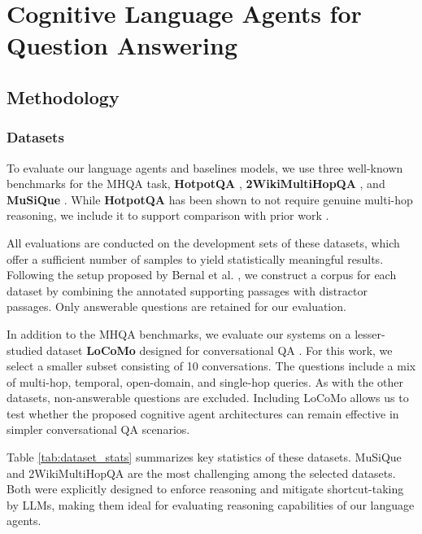 \cleardoublepage
\chapter{Cognitive Language Agents for Question Answering}
\label{ch:development}
\label{ch:chapter3}

\section{Methodology}
\subsection{Datasets}

To evaluate our language agents and baselines models, we use three  well-known benchmarks for the MHQA task, \textbf{HotpotQA} \cite{yang2018hotpotqa}, \textbf{2WikiMultiHopQA} \cite{ho-etal-2020-constructing}, and \textbf{MuSiQue} \cite{trivedi2021musique}. While \textbf{HotpotQA} has been shown to not require genuine multi-hop reasoning, we include it to support comparison with prior work \cite{trivedi2021musique}.

\noindent All evaluations are conducted on the development sets of these datasets, which offer a sufficient number of samples to yield statistically meaningful results. Following the setup proposed by Bernal et al. \cite{NEURIPS2024_6ddc001d}, we construct a corpus for each dataset by combining the annotated supporting passages with distractor passages. Only answerable questions are retained for our evaluation.

\noindent In addition to the MHQA benchmarks, we evaluate our systems on a lesser-studied dataset \textbf{LoCoMo} designed for conversational QA \cite{maharana-etal-2024-evaluating}. For this work, we select a smaller subset consisting of 10 conversations. The questions include a mix of multi-hop, temporal, open-domain, and single-hop queries. As with the other datasets, non-answerable questions are excluded. Including LoCoMo allows us to test whether the proposed cognitive agent architectures can remain effective in simpler conversational QA scenarios.

\noindent Table \ref{tab:dataset_stats} summarizes key statistics of these datasets. MuSiQue and 2WikiMultiHopQA are the most challenging among the selected datasets. Both were explicitly designed to enforce reasoning and mitigate shortcut-taking by LLMs, making them ideal for evaluating reasoning capabilities of our language agents.

